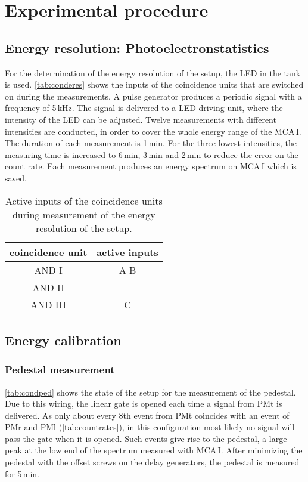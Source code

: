 \section{Experimental procedure}


\subsection{Energy resolution: Photoelectronstatistics}
For the determination of the energy resolution of the setup, the LED in the tank is used.
\autoref{tab:conderes} shows the inputs of the coincidence units that are switched on during the measurements.
A pulse generator produces a periodic signal with a frequency of 5\,kHz.
The signal is delivered to a LED driving unit, where the intensity of the LED can be adjusted.
Twelve measurements with different intensities are conducted, in order to cover the whole energy range of the MCA\,I.
The duration of each measurement is 1\,min.
For the three lowest intensities, the measuring time is increased to 6\,min, 3\,min and 2\,min to reduce the error
on the count rate.
Each measurement produces an energy spectrum on MCA\,I which is saved.

\begin{table}[H]
\caption{Active inputs of the coincidence units during measurement of the energy resolution of the setup.}
\begin{center}
\begin{tabular}{|c|c|}
  \hline
  coincidence unit	& active inputs	\\ \hline\hline
  AND I				& A B			\\ \hline
  AND II			& -				\\ \hline
  AND III			& C				\\ \hline
 \end{tabular}
\end{center}
\label{tab:conderes}
\end{table}

\subsection{Energy calibration}

\subsubsection{Pedestal measurement}
\autoref{tab:condped} shows the state of the setup for the measurement of the pedestal.
Due to this wiring, the linear gate is opened each time a signal from PMt is delivered.
As only about every 8th event from PMt coincides with an event of PMr and PMl (\autoref{tab:countrates}),
in this configuration most likely no signal will pass the gate when it is opened.
Such events give rise to the pedestal, a large peak at the low end of the spectrum measured with MCA\,I.
After minimizing the pedestal with the offset screws on the delay generators, the pedestal is measured for
5\,min.

